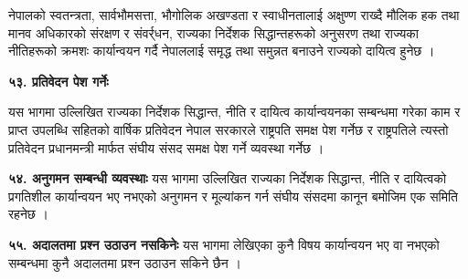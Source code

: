 नेपालको स्वतन्त्रता, सार्वभौमसत्ता, भौगोलिक अखण्डता र स्वाधीनतालाई अक्षुण्ण राख्दै मौलिक हक तथा मानव अधिकारको संरक्षण र
संवर्र्धन, राज्यका निर्देशक सिद्धान्तहरूको अनुसरण तथा राज्यका नीतिहरूको क्रमशः कार्यान्वयन गर्दै नेपाललाई समृद्ध तथा समुन्नत बनाउने राज्यको दायित्व हुनेछ ।

\textbf{५३. प्रतिवेदन पेश गर्नेः}

यस भागमा उल्लिखित राज्यका निर्देशक सिद्धान्त, नीति र दायित्व कार्यान्वयनका सम्बन्धमा गरेका काम र प्राप्त उपलब्धि सहितको वार्षिक प्रतिवेदन नेपाल सरकारले राष्ट्रपति समक्ष पेश गर्नेछ र राष्ट्रपतिले त्यस्तो प्रतिवेदन प्रधानमन्त्री मार्फत संघीय संसद समक्ष पेश गर्ने व्यवस्था गर्नेछ ।

\textbf{५४. अनुगमन सम्बन्धी व्यवस्थाः} यस भागमा उल्लिखित राज्यका निर्देशक सिद्धान्त, नीति र दायित्वको प्रगतिशील कार्यान्वयन भए नभएको अनुगमन र मूल्यांकन गर्न संघीय संसदमा कानून बमोजिम एक समिति रहनेछ ।

\textbf{५५. अदालतमा प्रश्न उठाउन नसकिनेः} यस भागमा लेखिएका कुनै विषय कार्यान्वयन भए वा नभएको सम्बन्धमा कुनै अदालतमा प्रश्न उठाउन सकिने छैन ।
